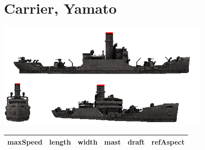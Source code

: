 \documentclass{article}
\author{Filip Socko}
\begin{document}
%

\section{Carrier, Yamato}
\begin{centering}
\includegraphics[width=0.8\textwidth, height=0.25\textheight]{AuxGunboat_sil}
\end{centering}

\begin{tabular}{|l|c|c|c|c|c|}
\hline
maxSpeed & length & width & mast & draft & refAspect \\
\hline

\end{tabular}
\end{document}
